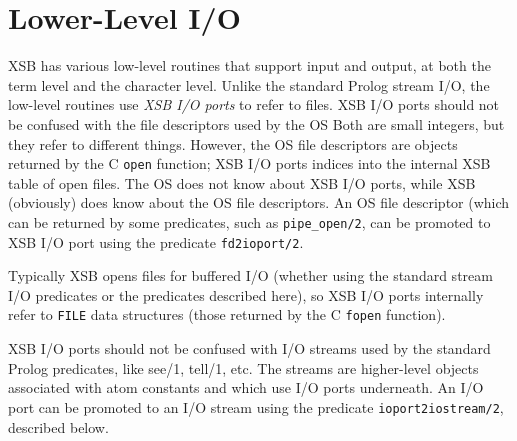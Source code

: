 \section{Lower-Level I/O}
\label{sec-low-level-io}

XSB has various low-level routines that support input and output, at both
the term level and the character level.  Unlike the standard Prolog stream
I/O, the low-level routines use \emph{XSB I/O ports} to refer to files. XSB
I/O ports should not be confused with the file descriptors used by the OS
Both are small integers, but they refer to different things. However, the
OS file descriptors are objects returned by the C {\tt open} function; XSB
I/O ports indices into the internal XSB table of open files. The OS does
not know about XSB I/O ports, while XSB (obviously) does know about the OS
file descriptors. An OS file descriptor (which can be returned by some
predicates, such as {\tt pipe\_open/2}, can be promoted to XSB I/O port
using the predicate {\tt fd2ioport/2}.

Typically XSB opens files for buffered I/O (whether using the standard
stream I/O predicates or the predicates described here), so XSB I/O ports
internally refer to {\tt FILE} data structures (those returned by the C
{\tt fopen} function).

XSB I/O ports should not be confused with I/O streams used by the standard
Prolog predicates, like see/1, tell/1, etc. The streams are higher-level
objects associated with atom constants and which use I/O ports underneath.
An I/O port can be promoted to an I/O stream using the predicate
{\tt ioport2iostream/2}, described below.

